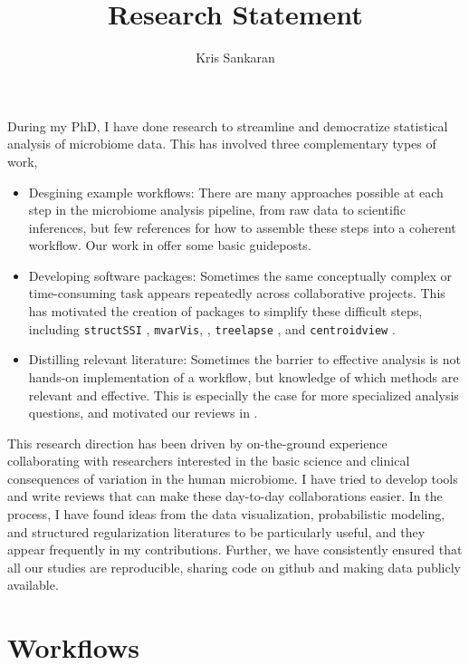\documentclass{article}
\title{Research Statement}
\author{Kris Sankaran}
\begin{document}
\maketitle

During my PhD, I have done research to streamline and democratize statistical
analysis of microbiome data. This has involved three complementary types of
work,
\begin{itemize}
\item Desgining example workflows: There are many approaches possible at each
  step in the microbiome analysis pipeline, from raw data to scientific
  inferences, but few references for how to assemble these steps into a coherent
  workflow. Our work in \citep{Callahan2016, Fukuyama2017} offer some basic
  guideposts.
\item Developing software packages: Sometimes the same conceptually complex or
  time-consuming task appears repeatedly across collaborative projects. This has
  motivated the creation of packages to simplify these difficult steps,
  including \texttt{structSSI} \citep{sankaran2014structssi}, \texttt{mvarVis},
  \citep{mvarvis}, \texttt{treelapse} \citep{Sankaran2017}, and
  \texttt{centroidview} \citep{centroidview}.
\item Distilling relevant literature: Sometimes the barrier to effective analysis is not
  hands-on implementation of a workflow, but knowledge of which methods are
  relevant and effective. This is especially the case for more specialized
  analysis questions, and motivated our reviews in
  \citep{sankaran2017latent}.
\end{itemize}

This research direction has been driven by on-the-ground experience
collaborating with researchers interested in the basic science and clinical
consequences of variation in the human microbiome. I have tried to develop tools
and write reviews that can make these day-to-day collaborations easier. In the
process, I have found ideas from the data visualization, probabilistic modeling,
and structured regularization literatures to be particularly useful, and they
appear frequently in my contributions. Further, we have consistently ensured
that all our studies are reproducible, sharing code on github and making data
publicly available.

\section{Workflows}
\end{document}
